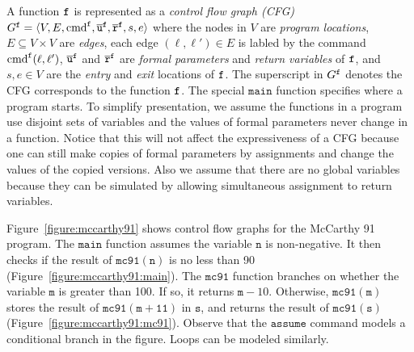 A function $\mathtt{{f}}$ is represented as a \emph{control flow graph
  (CFG)} $G^{\mathtt{{f}}} = \langle V, E, \textmd{cmd}^{\mathtt{{f}}},
\overline{\mathtt{u}}^{\mathtt{{f}}}, \overline{\mathtt{r}}^{\mathtt{{f}}}, s,
e \rangle$ where the nodes in $V$ are \emph{program locations}, $E
\subseteq V \times V$ are \emph{edges}, each edge $(\ell, \ell') \in
E$ is labled by the command $\textmd{cmd}^{\mathtt{{f}}} (\ell, \ell')$, $\overline{\mathtt{u}}^{\mathtt{{f}}}$ and $\overline{\mathtt{r}}^{\mathtt{{f}}}$ are \emph{formal parameters} and \emph{return variables} of $\mathtt{{f}}$, and $s,  e \in V$ are the \emph{entry} and \emph{exit} locations of $\mathtt{{f}}$. The superscript in $G^{\mathtt{{f}}}$ denotes the CFG corresponds to the function $\mathtt{{f}}$.
The special $\mathtt{main}$ function specifies where a program starts.
To simplify presentation, we assume the functions in a program use disjoint sets of variables and the values of formal parameters never change in a function. Notice that this will not affect the expressiveness of a CFG because one can still make copies of formal parameters by assignments and change the values of the copied versions. Also we assume that there are no global variables because they can be simulated by allowing simultaneous assignment to return variables. 

Figure~\ref{figure:mccarthy91} shows control flow graphs for the
McCarthy 91 program. The $\mathtt{main}$ function assumes the
variable $\mathtt{n}$ is non-negative. It then checks if the result
of $\mathtt{mc91(n)}$ is no less than 90
(Figure~\ref{figure:mccarthy91:main}). The $\mathtt{mc91}$ function
branches on whether the variable $\mathtt{m}$ is greater than 100. If
so, it returns $\mathtt{m} - 10$. Otherwise, 
$\mathtt{mc91(m)}$ stores the result of $\mathtt{mc91(m + 11)}$
in $\mathtt{s}$, and returns the result of $\mathtt{mc91(s)}$
(Figure~\ref{figure:mccarthy91:mc91}). Observe that the 
$\mathtt{assume}$ command models a conditional branch in the
figure. Loops can be modeled similarly.

